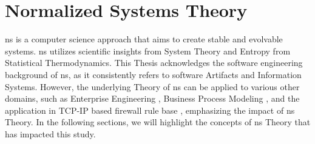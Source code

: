 \section{Normalized Systems Theory} \label{sec_ns_theory}

\gls{ns} is a computer science approach that aims to create stable and evolvable systems.
\gls{ns} utilizes scientific insights from System Theory and Entropy from Statistical
Thermodynamics. This Thesis acknowledges the software engineering background of \gls{ns},
as it consistently refers to software Artifacts and Information Systems. However, the
underlying Theory of \gls{ns} can be applied to various other domains, such as Enterprise
Engineering \parencite{huysmans_towards_2013}, Business Process Modeling
\parencite{van_nuel_towards_2011}, and the application in TCP-IP based firewall rule base
\parencite{haerens_evolvability_2021}, emphasizing the impact of \gls{ns} Theory. In the
following sections, we will highlight the concepts of \gls{ns} Theory that has impacted
this study.







